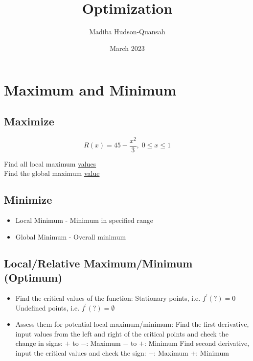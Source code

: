 \documentclass[12pt letter]{report}
\title{\Huge{Optimization}}
\author{\huge{Madiba Hudson-Quansah}}
\date{March 2023}
\begin{document}
\maketitle
\newpage
{}
\tableofcontents
\pagebreak

\chapter{Maximum and Minimum}

\section{Maximize}
\[
	R(x) = 45 - \frac{x^2}{3}, \; 0 \leq x \leq 1
\]
\begin{center}
	Find all local maximum \underline{values}\\
	Find the global maximum \underline{value}
\end{center}

\section{Minimize}

\begin{itemize}
	\item Local Minimum - Minimum in specified range
	\item Global Minimum - Overall minimum
\end{itemize}

\section{Local/Relative Maximum/Minimum (Optimum)}

\begin{itemize}
	\item Find the critical values of the function:
	      \subitem Stationary points, i.e. $f^{\prime}(?) = 0$
	      \subitem Undefined points, i.e. $f^{\prime}(?) = \emptyset$
	\item Assess them for potential local maximum/minimum:
	      \subitem Find the first derivative, input values from the left and right of the critical points and check the change in signs:
	      \subsubitem $+$ to $-$: Maximum
	      \subsubitem $-$ to $+$: Minimum
	      \subitem Find second derivative, input the critical values and check the sign:
	      \subsubitem $-$: Maximum
	      \subsubitem $+$: Minimum
\end{itemize}
\pagebreak
\end{document}
